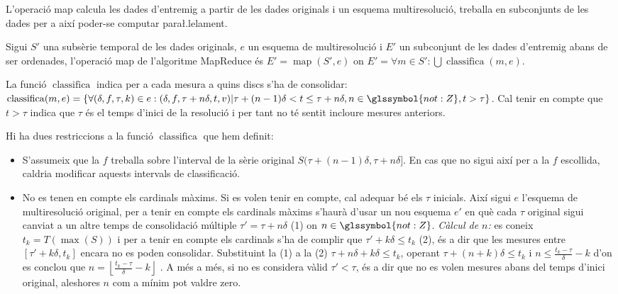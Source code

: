 L'operació map calcula les dades d'entremig a partir de les dades
originals i un esquema multiresolució, treballa en subconjunts de les
dades per a així poder-se computar para\l.lelament.
\begin{definition}
  Sigui $S'$ una subsèrie temporal de les dades originals, $e$ un
  esquema de multiresolució i $E'$ un subconjunt de les dades
  d'entremig abans de ser ordenades, l'operació map de l'algoritme
  MapReduce és $E'=\operatorname{map}(S',e)$ on $E'= \forall m \in S':
  \bigcup\operatorname{classifica}(m,e)$.

  La funció $\operatorname{classifica}$ indica per a cada mesura a quins
  discs s'ha de consolidar: $\operatorname{classifica}(m,e)=\{ \forall
  (\delta,f,\tau,k) \in e: (\delta,f,\tau+n\delta,t,v) |
  \tau+(n-1)\delta < t \leq \tau+n\delta, n\in\glssymbol{not:Z}, t >
  \tau \}$. Cal tenir en compte que $t > \tau$ indica que $\tau$ és el temps
  d'inici de la resolució i per tant no té sentit incloure mesures
  anteriors.
\end{definition}






Hi ha dues restriccions a la funció $\operatorname{classifica}$ que
hem definit: 
\begin{itemize}

\item S'assumeix que la $f$ treballa sobre l'interval de la sèrie
  original $S(\tau+(n-1)\delta ,\tau+n\delta]$. En cas que no sigui
  així per a la $f$ escollida, caldria modificar aquests intervals de
  classificació.

\item No es tenen en compte els cardinals màxims. Si es volen tenir en
  compte, cal adequar bé els $\tau$ inicials. Així sigui $e$ l'esquema
  de multiresolució original, per a tenir en compte els cardinals
  màxims s'haurà d'usar un nou esquema $e'$ en què cada $\tau$
  original sigui canviat a un altre temps de consolidació múltiple
  $\tau'= \tau+n\delta$ (1) on $n\in\glssymbol{not:Z}$.  \emph{Càlcul
    de $n$:} es coneix $t_k=T(\max(S))$ i per a tenir en compte els
  cardinals s'ha de complir que $\tau'+k\delta \leq t_k$ (2), és a dir
  que les mesures entre $[\tau'+k\delta,t_k]$ encara no es poden
  consolidar.  Substituint la (1) a la (2) $\tau+n\delta+k\delta \leq
  t_k$, operant $\tau+(n+k)\delta \leq t_k$ i $n \leq
  \frac{t_k-\tau}{\delta}-k$ d'on es conclou que $n = \left\lfloor
    \frac{t_k-\tau}{\delta}-k \right\rfloor$ .  A més a més, si no es
  considera vàlid $\tau'<\tau$, és a dir que no es volen mesures abans
  del temps d'inici original, aleshores $n$ com a mínim pot valdre
  zero.

\end{itemize}



